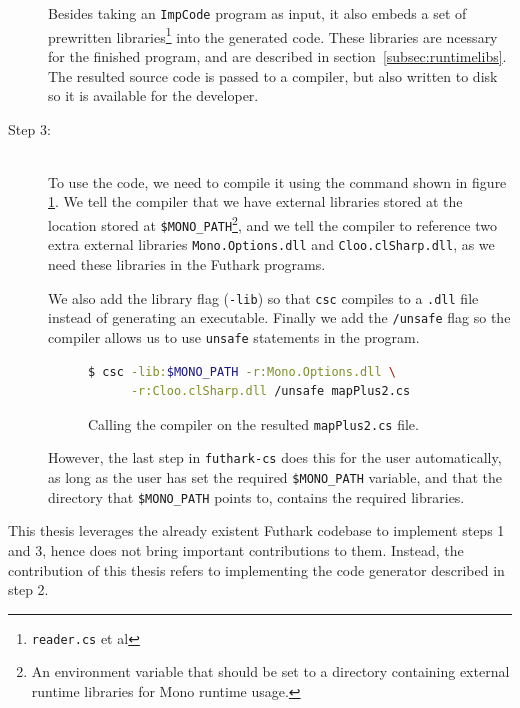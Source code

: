\begin{description}
Besides taking an \texttt{ImpCode} program as input, it also embeds a set of
prewritten \csharp{} libraries\footnote{\texttt{reader.cs} et al} into the generated \csharp{} code. These
libraries are ncessary for the finished \csharp{} program, and are described in
section~\ref{subsec:runtimelibs}.\\
The resulted \csharp{} source code is passed to a \csharp{} compiler, but also
written to disk so it is available for the developer.

\item[Step 3:]\hfill\\
  To use the \csharp{} code, we need to compile it using the command shown in
  figure \ref{fig:callcsc}. We tell the compiler that we have external libraries
  stored at the location stored at \texttt{\$MONO\_PATH}\footnote{An environment
  variable that should be set to a directory containing external runtime
  libraries for Mono runtime usage.}, and we tell the compiler to
  reference two extra external libraries \texttt{Mono.Options.dll} and
  \texttt{Cloo.clSharp.dll}, as we need these libraries in the Futhark \csharp{} programs.

  We also add the library flag ({\tt -lib}) so that \texttt{csc} compiles to a \texttt{.dll} file instead of
  generating an executable. Finally we add the \texttt{/unsafe} flag so the
  compiler allows us to use \texttt{unsafe} statements in the \csharp{} program.

\begin{figure}[H]
  \centering
  \begin{lstlisting}[language=sh]
$ csc -lib:$MONO_PATH -r:Mono.Options.dll \
      -r:Cloo.clSharp.dll /unsafe mapPlus2.cs
  \end{lstlisting}
  \caption{Calling the \csharp{} compiler on the resulted {\tt mapPlus2.cs} file.}
  \label{fig:callcsc}
\end{figure}

However, the last step in \texttt{futhark-cs} does this for the user
automatically, as long as the user has set the required \texttt{\$MONO\_PATH}
variable, and that the directory that \texttt{\$MONO\_PATH} points to, contains the
required libraries.

\end{description}

This thesis leverages the already existent Futhark codebase to implement 
steps 1 and 3, hence does not bring important contributions to them. 
Instead, the contribution of this thesis refers to implementing the 
code generator described in step 2.

